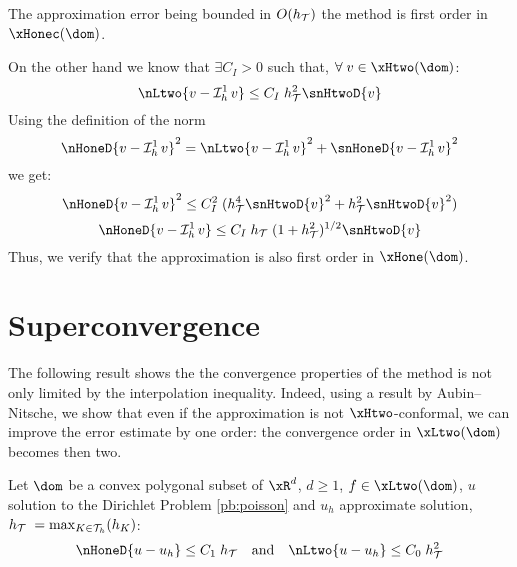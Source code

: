 The approximation error being bounded in $O(h_{\mathcal T})$ the method is first order in $\xHonec(\dom)$.

\begin{rmrk}
On the other hand we know that $\exists C_I > 0 $ such that, $\forany v \in \xHtwo(\dom)$:
\begin{equation*}
\nLtwo{v - \Lgrh{1} v} \leq C_I\; \sizeT^2 \snHtwoD{v}
\end{equation*}
Using the definition of the norm
\begin{equation*}
\nHoneD{v - \Lgrh{1} v}^2 = \nLtwo{v - \Lgrh{1} v}^2 + \snHoneD{v - \Lgrh{1} v}^2
\end{equation*}
we get:
\begin{equation*}
\nHoneD{v - \Lgrh{1} v}^2 \leq C_I^2\; (\sizeT^4 \snHtwoD{v}^2 + \sizeT^2 \snHtwoD{v}^2)
\end{equation*}
\begin{equation*}
\nHoneD{v - \Lgrh{1} v} \leq C_I\; \sizeT\;(1 + \sizeT^2)^{1/2} \snHtwoD{v}
\end{equation*}
Thus, we verify that the approximation is also first order in $\xHone(\dom)$.
\end{rmrk}

\section{Superconvergence}

The following result shows the the convergence properties of the method is not only limited by the interpolation inequality.
Indeed, using a result by Aubin--Nitsche, we show that even if the approximation is not $\xHtwo$-conformal, we can improve the error estimate by one order: the convergence order in $\xLtwo(\dom)$ becomes then two.

\begin{thrm}[Superconvergence]
Let $\dom$ be a convex polygonal subset of $\xR^d$, $d \geq 1$, $f \in \xLtwo(\dom)$, $u$ solution to the Dirichlet Problem \eqref{pb:poisson} and $u_h$ approximate solution, $h_{\mathcal T}\;= \max_{K\in{\mathcal T}_h}(h_K)$:
\begin{equation*}
\nHoneD{u - u_h}  \leq C_1\;\sizeT\quad\mbox{and}\quad\nLtwo{u - u_h}  \leq C_0\;\sizeT^2
\end{equation*}
\end{thrm}

